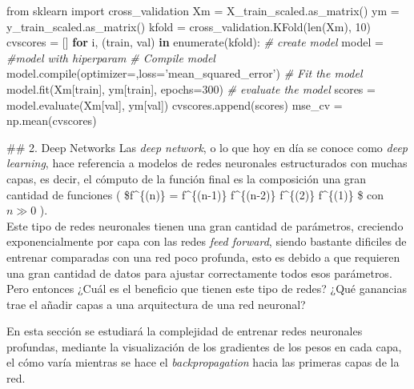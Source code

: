\documentclass[11pt]{article}
\newenvironment{Shaded}{}{}
\newcommand{\KeywordTok}[1]{\textcolor[rgb]{0.00,0.44,0.13}{\textbf{{#1}}}}
\newcommand{\DecValTok}[1]{\textcolor[rgb]{0.25,0.63,0.44}{{#1}}}
\newcommand{\StringTok}[1]{\textcolor[rgb]{0.25,0.44,0.63}{{#1}}}
\newcommand{\CommentTok}[1]{\textcolor[rgb]{0.38,0.63,0.69}{\textit{{#1}}}}
\newcommand{\NormalTok}[1]{{#1}}
\newcommand{\ImportTok}[1]{{#1}}
\newcommand{\ControlFlowTok}[1]{\textcolor[rgb]{0.00,0.44,0.13}{\textbf{{#1}}}}
\newcommand{\OperatorTok}[1]{\textcolor[rgb]{0.40,0.40,0.40}{{#1}}}
\newcommand{\BuiltInTok}[1]{{#1}}
\begin{document}
\begin{Shaded}
\begin{Highlighting}[]
\ImportTok{from}\NormalTok{ sklearn }\ImportTok{import}\NormalTok{ cross_validation}
\NormalTok{Xm }\OperatorTok{=}\NormalTok{ X_train_scaled.as_matrix()}
\NormalTok{ym }\OperatorTok{=}\NormalTok{ y_train_scaled.as_matrix()}
\NormalTok{kfold }\OperatorTok{=}\NormalTok{ cross_validation.KFold(}\BuiltInTok{len}\NormalTok{(Xm), }\DecValTok{10}\NormalTok{)}
\NormalTok{cvscores }\OperatorTok{=}\NormalTok{ []}
\ControlFlowTok{for}\NormalTok{ i, (train, val) }\KeywordTok{in} \BuiltInTok{enumerate}\NormalTok{(kfold):}
    \CommentTok{# create model}
\NormalTok{    model }\OperatorTok{=} \CommentTok{#model with hiperparam}
    \CommentTok{# Compile model}
\NormalTok{    model.}\BuiltInTok{compile}\NormalTok{(optimizer}\OperatorTok{=}\NormalTok{,loss}\OperatorTok{=}\StringTok{'mean_squared_error'}\NormalTok{)}
    \CommentTok{# Fit the model}
\NormalTok{    model.fit(Xm[train], ym[train], epochs}\OperatorTok{=}\DecValTok{300}\NormalTok{)}
    \CommentTok{# evaluate the model}
\NormalTok{    scores }\OperatorTok{=}\NormalTok{ model.evaluate(Xm[val], ym[val])}
\NormalTok{    cvscores.append(scores)}
\NormalTok{mse_cv }\OperatorTok{=}\NormalTok{ np.mean(cvscores)}
\end{Highlighting}
\end{Shaded}

     \#\# 2. Deep Networks Las \emph{deep network}, o lo que hoy en día se
conoce como \emph{deep learning}, hace referencia a modelos de redes
neuronales estructurados con muchas capas, es decir, el cómputo de la
función final es la composición una gran cantidad de funciones (
\$f\^{}\{(n)\} = f\^{}\{(n-1)\} \circ f\^{}\{(n-2)\}
\circ \cdots \circ f\^{}\{(2)\} \circ f\^{}\{(1)\} \$ con \(n \gg 0\)
).\\
Este tipo de redes neuronales tienen una gran cantidad de parámetros,
creciendo exponencialmente por capa con las redes \emph{feed forward},
siendo bastante dificiles de entrenar comparadas con una red poco
profunda, esto es debido a que requieren una gran cantidad de datos para
ajustar correctamente todos esos parámetros. Pero entonces ¿Cuál es el
beneficio que tienen este tipo de redes? ¿Qué ganancias trae el añadir
capas a una arquitectura de una red neuronal?

En esta sección se estudiará la complejidad de entrenar redes neuronales
profundas, mediante la visualización de los gradientes de los pesos en
cada capa, el cómo varía mientras se hace el \emph{backpropagation}
hacia las primeras capas de la red.
\end{document}
